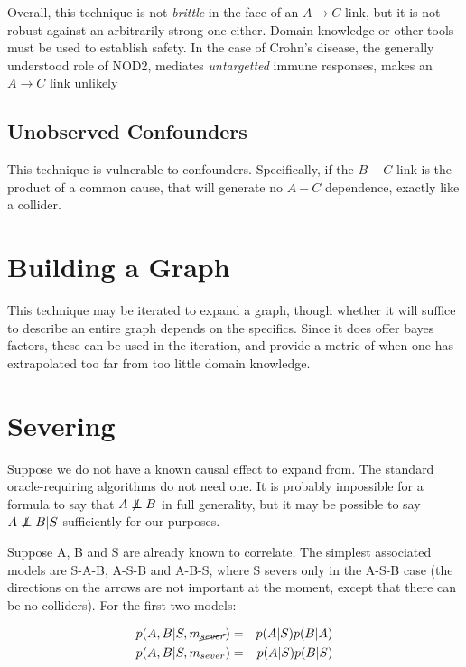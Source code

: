 \documentclass[twocolumn,12pt]{article}
\newcommand\indep{\protect\mathpalette{\protect\independenT}{\perp}}
\def\independenT#1#2{\mathrel{\rlap{$#1#2$}\mkern2mu{#1#2}}}
\begin{document}
Overall, this technique is not \textit{brittle} in the face of an
$A \rightarrow C$ link, but it is not robust against an arbitrarily
strong one either.  Domain knowledge or other tools must be used to
establish safety.  In the case of Crohn's disease, the generally
understood role of NOD2, mediates \textit{untargetted} immune
responses,\cite{nod2} makes an $A\rightarrow C$ link unlikely

\subsection{Unobserved Confounders}

This technique is vulnerable to confounders.  Specifically, if the
$B-C$ link is the product of a common cause, that will generate no
$A-C$ dependence, exactly like a collider.

\section{Building a Graph}

This technique may be iterated to expand a graph, though whether it
will suffice to describe an entire graph depends on the specifics.
Since it does offer bayes factors, these can be used in the iteration,
and provide a metric of when one has extrapolated too far from too
little domain knowledge.

\section{Severing}

Suppose we do not have a known causal effect to expand from.  The
standard oracle-requiring algorithms do not need one.  It is probably
impossible for a formula to say that $A\not\indep B$ in full
generality, but it may be possible to say $A\not\indep B|S$
sufficiently for our purposes.

Suppose A, B and S are already known to correlate.  The simplest
associated models are S-A-B, A-S-B and A-B-S, where S severs only in
the A-S-B case (the directions on the arrows are not important at the
moment, except that there can be no colliders).  For the first two
models:

\begin{eqnarray*}
  p(A,B|S,m_{\cancel{sever}}) & = & p(A|S)p(B|A) \\
  p(A,B|S,m_{sever}) & = & p(A|S)p(B|S)
\end{eqnarray*}
\end{document}
